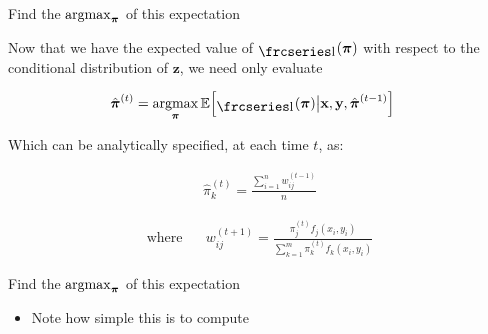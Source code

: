 \documentclass{beamer}
\newcommand{\textfrc}[1]{{\frcseries#1}}
\newcommand{\mathfrc}[1]{\raisebox{-0.8mm}{\text{\textfrc{\small #1}}}\hspace{0.4mm}}
\newcommand{\eqn}[1]{\begin{align*}
#1
\end{align*}}
\newcommand{\vect}[1]{\boldsymbol{\mathbf{#1}}}
\newcommand{\argmax}{\operatornamewithlimits{argmax}}
\newcommand{\leftlbl}[1]{\mbox{#1} \;\;\;\;\;\;}
\newcommand{\vx}{\vect{x}}
\newcommand{\vy}{\vect{y}}
\newcommand{\vp}{\vect{\pi}}
\newcommand{\vph}{\hat{\vect{\pi}}}
\newcommand{\sumn}{\sum^n_{i=1}}
\newcommand{\sumk}{\sum^m_{k=1}}
\newcommand{\fab}{f_j}
\newcommand{\llp}{\mathfrc{l}(\vect{\pi})}
\begin{document}
\begin{frame}{Find the $\argmax_{\vp}$ of this expectation}
	
		
	Now that we have the expected value of $\llp$ with respect to the conditional distribution of $\vect{z}$, we need only evaluate
	
	
	\eqn{
		\vph^{(t)} &= \argmax_{\vp} \mathbb{E}\Big[\llp \big| \vx,\vy,\vph^{(t-1)} \Big]   
	}
	
	
	Which can be analytically specified, at each time $t$, as:
	
	\eqn{
		\hat{\pi}^{(t)}_k  = \frac{\sumn w^{(t-1)}_{ij}}{n}
	}
	
	\eqn{
		\leftlbl{where} w^{(t+1)}_{ij} = \frac{\pi^{(t)}_{j} \fab(x_i,y_i)}{\sumk \pi^{(t)}_{k}f_k(x_i,y_i)}	
	}
	

	
\end{frame}
\begin{frame}[shrink]{Find the $\argmax_{\vp}$ of this expectation}
	
	\begin{itemize}
		\item Note how simple this is to compute
	\end{itemize}
	
\end{frame}
\end{document}
